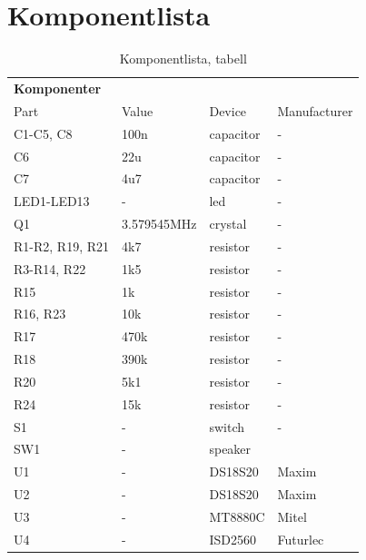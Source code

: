 \documentclass[a4paper,11pt]{article}
\begin{document}
	\section{Komponentlista}
	\label{sec:komponentlistasec}
	\begin{table} [H]
	\caption{Komponentlista, tabell} 
	\label{tab:komponentlista}
	\begin{tabular}{l l l l}
		
		{\bf Komponenter}
		\\{Part} & {Value} & {Device} & {Manufacturer} \\
		\hline
C1-C5, C8 & 100n & capacitor & - \\
C6 & 22u & capacitor & -  \\
C7 & 4u7 & capacitor & -  \\
LED1-LED13 & - & led & -  \\
Q1 & 3.579545MHz & crystal & -  \\
R1-R2, R19, R21 & 4k7 & resistor & -  \\
R3-R14, R22 & 1k5 & resistor & -  \\
R15 & 1k & resistor & -  \\
R16, R23 & 10k & resistor & -  \\
R17 & 470k & resistor & -  \\
R18 & 390k & resistor & -  \\
R20 & 5k1 & resistor & -  \\
R24 & 15k & resistor & -  \\
S1 & - & switch & -  \\
SW1 & - & speaker \\
U1 & - & DS18S20 & Maxim  \\
U2 & - & DS18S20 & Maxim  \\
U3 & - & MT8880C & Mitel  \\
U4 & - & ISD2560 & Futurlec  \\

	\end{tabular}
	\end{table}
\end{document}
